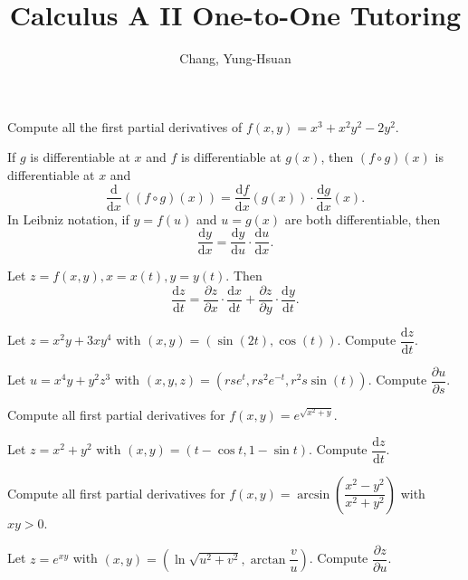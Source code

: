 \documentclass[11pt]{article}
\title{\textbf{Calculus A II One-to-One Tutoring}}
\author{Chang, Yung-Hsuan}
\theoremstyle{break}
\newcommand{\differentiate}[1]{\dfrac{\dd}{\dd{#1}}}
\newcommand{\derivative}[2]{\dfrac{\dd{#1}}{\dd{#2}}}
\newcommand{\pderivative}[2]{\dfrac{\partial {#1}}{\partial {#2}}}
\newcommand{\dd}{\text{d}}
\numberwithin{equation}{theorem}
\begin{document}
\maketitle

\begin{example}
    Compute all the first partial derivatives of $f(x, y)=x^3+x^2y^2-2y^2$.
\end{example}

\begin{recall}
    If $g$ is differentiable at $x$ and $f$ is differentiable at $g(x)$, then $(f\circ g)(x)$ is differentiable at $x$ and $$\differentiate{x}\left((f\circ g)(x)\right)=\derivative{f}{x}(g(x))\cdot\derivative{g}{x}(x).$$
    In Leibniz notation, if $y=f(u)$ and $u=g(x)$ are both differentiable, then $$\derivative{y}{x}=\derivative{y}{u}\cdot\derivative{u}{x}.$$
\end{recall}

\begin{theorem}
    Let $z=f(x, y), x=x(t), y=y(t)$. Then $$\derivative{z}{t}=\pderivative{z}{x}\cdot\derivative{x}{t}+\pderivative{z}{y}\cdot\derivative{y}{t}.$$
\end{theorem}

\begin{example}
    Let $z=x^2y+3xy^4$ with $(x, y)=(\sin(2t), \cos(t))$. Compute $\derivative{z}{t}$.
\end{example}

\begin{example}
    Let $u=x^4y+y^2z^3$ with $(x, y, z)=(rse^t, rs^2e^{-t}, r^2s\sin(t))$. Compute $\pderivative{u}{s}$.
\end{example}

\begin{example}
    Compute all first partial derivatives for $f(x, y)=e^{\sqrt{x^2+y}}$.
\end{example}

\begin{example}
    Let $z=x^2+y^2$ with $(x, y)=(t-\cos t, 1-\sin t)$. Compute $\derivative{z}{t}$.
\end{example}

\begin{example}
    Compute all first partial derivatives for $f(x, y)=\arcsin\left(\dfrac{x^2-y^2}{x^2+y^2}\right)$ with $xy>0$.
\end{example}

\begin{example}
    Let $z=e^{xy}$ with $(x, y)=\left(\ln\sqrt{u^2+v^2}, \arctan\dfrac{v}{u}\right)$. Compute $\pderivative{z}{u}$.
\end{example}
\end{document}
